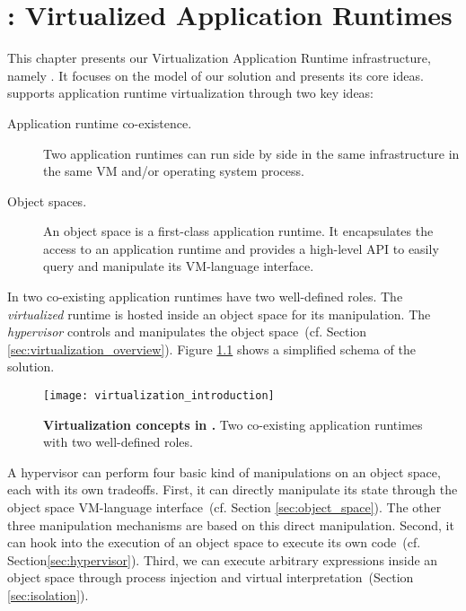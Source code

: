 

\chapter{\VTT: Virtualized Application Runtimes}
\minitoc
\introduction

This chapter presents our Virtualization Application Runtime infrastructure, namely \VTT. It focuses on the model of our solution and presents its core ideas. \VTT supports application runtime virtualization through two key ideas:

\begin{description}
\item[Application runtime co-existence.] Two application runtimes can run side by side in the same infrastructure \eg in the same VM and/or operating system process.
\item[Object spaces.] An object space is a first-class application runtime. It encapsulates the access to an application runtime and provides a high-level API to easily query and manipulate its VM-language interface.
\end{description}

In \Vtt two co-existing application runtimes have two well-defined roles. The \emph{virtualized} runtime is hosted inside an object space for its manipulation. The \emph{hypervisor} controls and manipulates the object space~(cf. Section \ref{sec:virtualization_overview}).
Figure \ref{fig:virtualization_introduction} shows a simplified schema of the solution.

\begin{figure}[htb]
\begin{center}
\texttt{[image: virtualization\_introduction]}
\caption{\textbf{Virtualization concepts in \Vtt.} Two co-existing application runtimes with two well-defined roles.\label{fig:virtualization_introduction}}
\end{center}
\end{figure}

A hypervisor can perform four basic kind of manipulations on an object space, each with its own tradeoffs. First, it can directly manipulate its state through the object space VM-language interface~(cf. Section \ref{sec:object_space}). The other three manipulation mechanisms are based on this direct manipulation. Second, it can hook into the execution of an object space to execute its own code~(cf. Section\ref{sec:hypervisor}). Third, we can execute arbitrary expressions inside an object space through process injection and virtual interpretation~(Section \ref{sec:isolation}). %


